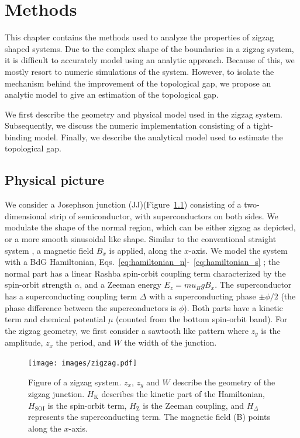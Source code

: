 \chapter{Methods}\label{chap:methods}
    This chapter contains the methods used to analyze the properties of zigzag shaped systems.
    Due to the complex shape of the boundaries in a zigzag system, it is difficult to accurately model using an analytic approach.
    Because of this, we mostly resort to numeric simulations of the system.
    However, to isolate the mechanism behind the improvement of the topological gap, we propose an analytic model to give an estimation of the topological gap.
    
    We first describe the geometry and physical model used in the zigzag system.
    Subsequently, we discuss the numeric implementation consisting of a tight-binding model.
    Finally, we describe the analytical model used to estimate the topological gap.

\section{Physical picture}\label{sec:physical_picture}
	We consider a Josephson junction (JJ)(Figure~\ref{fig:setup}) consisting of a two-dimensional strip of semiconductor, with superconductors on both sides.
	We modulate the shape of the normal region, which can be either zigzag as depicted, or a more smooth sinusoidal like shape.
	Similar to the conventional straight system \cite{pientka_topological_2017}, a magnetic field $B_x$ is applied, along the $x$-axis.
	We model the system with a BdG Hamiltonian, Eqs.~\eqref{eq:hamiltonian_n}-~\eqref{eq:hamiltonian_s}  ; the normal part has a linear Rashba spin-orbit coupling term characterized by the spin-orbit strength $\alpha$, and a Zeeman energy $E_z= mu_B g B_x$.
	The superconductor has a superconducting coupling term $\Delta$ with a superconducting phase $\pm\phi/2$ (the phase difference between the superconductors is $\phi$).
	Both parts have a kinetic term and chemical potential $\mu$ (counted from the bottom spin-orbit band). 
	For the zigzag geometry, we first consider a sawtooth like pattern where $z_y$ is the amplitude, $z_x$ the period, and $W$ the width of the junction.

	\begin{figure}[!htb]
	\centering
	\texttt{[image: images/zigzag.pdf]}
	\caption{Figure of a zigzag system.
	$z_x$, $z_y$ and $W$ describe the geometry of the zigzag junction.
	$H_\text{K}$ describes the kinetic part of the Hamiltonian, $H_\text{SOI}$ is the spin-orbit term, $H_\text{Z}$ is the Zeeman coupling, and $H_\Delta$ represents the superconducting term.
	The magnetic field (B) points along the $x$-axis.
	\label{fig:setup}}
	\end{figure}

